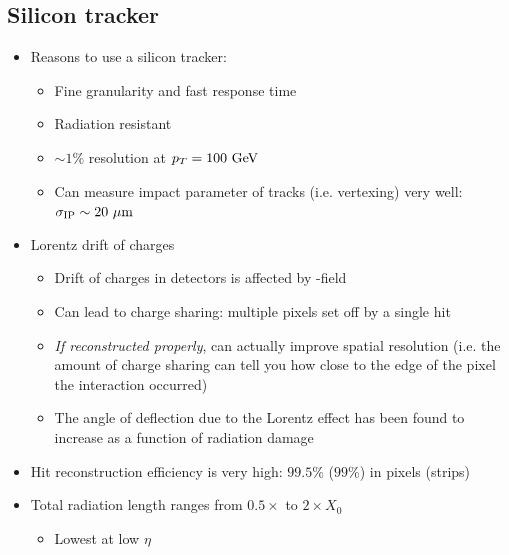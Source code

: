 \subsection{Silicon tracker}
\begin{itemize}
  \item Reasons to use a silicon tracker:
  \begin{itemize}
    \item Fine granularity and fast response time
    \item Radiation resistant
    \item $\sim1\%$ resolution at $p_T = 100~\text{GeV}$
    \item Can measure impact parameter of tracks (i.e. vertexing) very well: $\sigma_\text{IP}\sim 20~\mu\text{m}$
  \end{itemize}
  \item Lorentz drift of charges
  \begin{itemize}
    \item Drift of charges in detectors is affected by \B-field
    \item Can lead to charge sharing: multiple pixels set off by a single hit
    \item \emph{If reconstructed properly}, can actually improve spatial resolution (i.e. the amount of charge sharing can tell you how close to the edge of the pixel the interaction occurred)
    \item The angle of deflection due to the Lorentz effect has been found to increase as a function of radiation damage
  \end{itemize}
  \item Hit reconstruction efficiency is very high: $99.5\%$ ($99\%$) in pixels (strips)
  \item Total radiation length ranges from $0.5\times$ to $2\times X_0$
  \begin{itemize}
    \item Lowest at low $\eta$
  \end{itemize}
\end{itemize}


